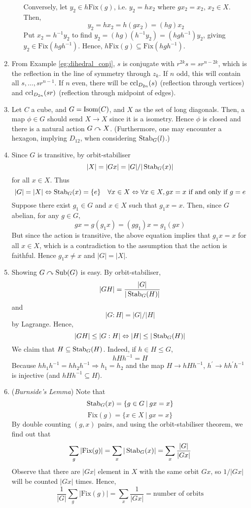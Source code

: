 \documentclass[10pt, a4paper, twoside]{report}
\begin{document}
\begin{enumerate}[{1.}]
\begin{enumerate}[{(a)}]
        Conversely, let \(y_2\in h\text{Fix}(g)\), i.e. \(y_2=hx_2\) where \(gx_2=x_2\), \(x_2\in X\). Then, 
        \[y_2=hx_2=h(gx_2)=(hg)x_2\]
        Put \(x_2=h^{-1}y_2\) to find \(y_2=(hg)(h^{-1}y_2)=(hgh^{-1})y_2\), giving \(y_2\in\text{Fix}(hgh^{-1})\). Hence, \(h\text{Fix}(g)\subseteq\text{Fix}(hgh^{-1})\).
    \end{enumerate}
    \item From Example \ref{eg:dihedral_conj}, \(s\) is conjugate with \(r^{2k}s=sr^{n-2k}\), which is the reflection in the line of symmetry through \(z_k\). If \(n\) odd, this will contain all \(s,\ldots,sr^{n-1}\). If \(n\) even, there will be \(\operatorname{ccl}_{D_{2n}}(s)\) (reflection through vertices) and \(\operatorname{ccl}_{D_{2n}}(sr)\) (reflection through midpoint of edges).
    \item Let \(C\) a cube, and \(G=\operatorname{Isom}(C)\), and \(X\) as the set of long diagonals. Then, a map \(\phi\in G\) should send \(X\to X\) since it is a isometry. Hence \(\phi\) is closed and there is a natural action \(G\curvearrowright X\). (Furthermore, one may encounter a hexagon, implying \(D_{12}\), when considering \(\operatorname{Stab}_G(l)\).)
    \item Since \(G\) is transitive, by orbit-stabiliser
    \[|X|=|Gx|=|G|/|\operatorname{Stab}_G(x)|\]
    for all \(x\in X\). Thus 
    \[|G|=|X|\Leftrightarrow\operatorname{Stab}_G(x)=\{e\}\quad\forall x\in X\Leftrightarrow\forall x\in X,gx=x\text{  if and only if  }g=e\]
    Suppose there exist \(g_1\in G\) and \(x\in X\) such that \(g_1x=x\). Then, since \(G\) abelian, for any \(g\in G\),
    \[gx=g(g_1x)=(gg_1)x=g_1(gx)\]
    But since the action is transitive, the above equation implies that \(g_1x=x\) for all \(x\in X\), which is a contradiction to the assumption that the action is faithful.
    Hence \(g_1x\neq x\) and \(|G|=|X|\).
    \item Showing \(G\curvearrowright\text{Sub}(G)\) is easy. By orbit-stabiliser,
    \[|GH|=\frac{|G|}{|\operatorname{Stab}_G(H)|}\]
    and 
    \[|G:H|=|G|/|H|\]
    by Lagrange. Hence, 
    \[|GH|\leq|G:H|\Leftrightarrow |H|\leq|\operatorname{Stab}_G(H)|\]
    We claim that \(H\subseteq\operatorname{Stab}_G(H)\). Indeed, if \(h\in H\leq G\),
    \[hHh^{-1}=H\]
    Because \(hh_1h^{-1}=hh_2h^{-1}\Rightarrow h_1=h_2\) and the map \(H\to hHh^{-1}\), \(h^\prime\to hh^\prime h^{-1}\) is injective (and \(hHh^{-1}\subseteq H\)).
    \item (\emph{Burnside's Lemma}) Note that 
    \[\operatorname{Stab}_G(x)=\{g\in G\:|\:gx=x\}\]
    \[\text{Fix}(g)=\{x\in X\:|\:gx=x\}\]
    By double counting \((g,x)\) pairs, and using the orbit-stabiliser theorem, we find out that 
    \[\sum_g|\text{Fix}(g)|=\sum_x|\operatorname{Stab}_G(x)|=\sum_x\frac{|G|}{|Gx|}\]
    Observe that there are \(|Gx|\) element in \(X\) with the same orbit \(Gx\), so \(1/|Gx|\) will be counted \(|Gx|\) times. Hence,
    \[\frac 1{|G|}\sum_g|\text{Fix}(g)|=\sum_x\frac{1}{|Gx|}=\text{number of orbits}\]


\end{enumerate}
\end{document}
